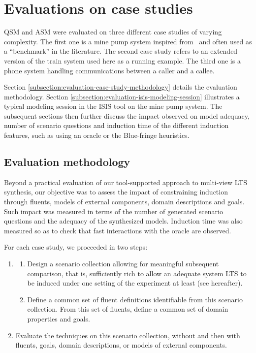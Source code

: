 \section{Evaluations on case studies\label{section:evaluation-experiments-on-case-studies}}

QSM and ASM were evaluated on three different case studies of varying complexity. The first one is a mine pump system inspired from~\cite{Joseph:1996} and often used as a ``benchmark'' in the literature. The second case study refers to an extended version of the train system used here as a running example. The third one is a phone system handling communications between a caller and a callee.

Section \ref{subsection:evaluation-case-study-methodology} details the evaluation methodology. Section \ref{subsection:evaluation-isis-modeling-session} illustrates a typical modeling session in the ISIS tool on the mine pump system. The subsequent sections then further discuss the impact observed on model adequacy, number of scenario questions and induction time of the different induction features, such as using an oracle or the Blue-fringe heuristics.

\subsection{Evaluation methodology\label{subsection:evaluation-case-study-methodology}}

Beyond a practical evaluation of our tool-supported approach to multi-view LTS synthesis, our objective was to assess the impact of constraining induction through fluents, models of external components, domain descriptions and goals. Such impact was measured in terms of the number of generated scenario questions and the adequacy of the synthesized models. Induction time was also measured so as to check that fast interactions with the oracle are observed.

For each case study, we proceeded in two steps:
\begin{enumerate}
\item\label{stepA}
\begin{enumerate}
\item\label{CondA} Design a scenario collection allowing for meaningful subsequent comparison, that is, sufficiently rich to allow an adequate system LTS to be induced under one setting of the experiment at least (see hereafter).
\item\label{CondB} Define a common set of fluent definitions identifiable from this scenario collection. From this set of fluents, define a common set of domain properties and goals.
\end{enumerate}
\item\label{stepB} Evaluate the techniques on this scenario collection, without and then with fluents, goals, domain descriptions, or models of external components.
\end{enumerate}

